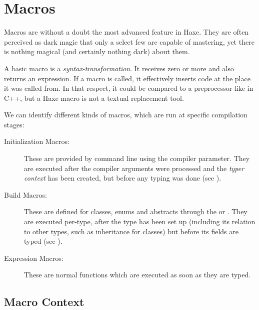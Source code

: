 \chapter{Macros}
\label{macro}

Macros are without a doubt the most advanced feature in Haxe. They are often perceived as dark magic that only a select few are capable of mastering, yet there is nothing magical (and certainly nothing dark) about them.




A basic macro is a \emph{syntax-transformation}. It receives zero or more  and also returns an expression. If a macro is called, it effectively inserts code at the place it was called from. In that respect, it could be compared to a preprocessor like  in C++, but a Haxe macro is not a textual replacement tool.

We can identify different kinds of macros, which are run at specific compilation stages:

\begin{description}
	\item[Initialization Macros:] These are provided by command line using the  compiler parameter. They are executed after the compiler arguments were processed and the \emph{typer context} has been created, but before any typing was done (see ).
	\item[Build Macros:] These are defined for classes, enums and abstracts through the  or  . They are executed per-type, after the type has been set up (including its relation to other types, such as inheritance for classes) but before its fields are typed (see ).
	\item[Expression Macros:] These are normal functions which are executed as soon as they are typed.
\end{description}
	
\section{Macro Context}
\label{macro-context}

